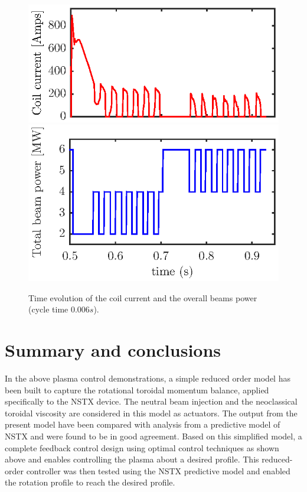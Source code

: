 \documentclass{iopart}
\begin{document}
\begin{figure}
	\centering
	\includegraphics{imene_figs/fig19a}  \\[-0.5em] %
	\includegraphics{imene_figs/fig19b} 
	\caption{Time evolution of the coil current and the overall beams power (cycle time $0.006 s$). }
	\label{fig:rot17}
\end{figure}


\section{Summary and conclusions}
\label{sec:conclusions}

In the above plasma control demonstrations, a simple reduced order model has been built to capture the rotational toroidal momentum balance, applied specifically to the NSTX device. The neutral beam injection and the neoclassical toroidal viscosity are considered in this model as actuators. The output from the present model have been compared with analysis from a predictive model of NSTX and were found to be in good agreement.
Based on this simplified model, a complete feedback control design using optimal control techniques as shown above and enables controlling the plasma about a desired profile. This reduced-order controller was then tested using the NSTX predictive model and enabled the rotation profile to reach the desired profile.
\end{document}
